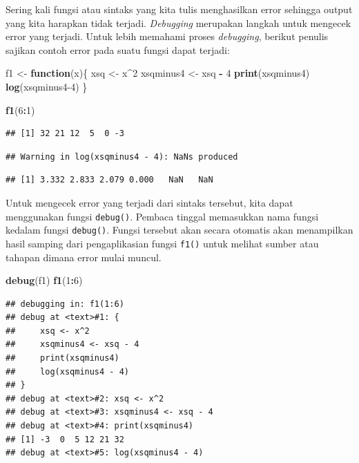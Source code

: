 \documentclass[
]{book}
\newenvironment{Shaded}{\begin{snugshade}}{\end{snugshade}}
\newcommand{\ControlFlowTok}[1]{\textcolor[rgb]{0.13,0.29,0.53}{\textbf{#1}}}
\newcommand{\DecValTok}[1]{\textcolor[rgb]{0.00,0.00,0.81}{#1}}
\newcommand{\FunctionTok}[1]{\textcolor[rgb]{0.13,0.29,0.53}{\textbf{#1}}}
\newcommand{\NormalTok}[1]{#1}
\newcommand{\OtherTok}[1]{\textcolor[rgb]{0.56,0.35,0.01}{#1}}
\newcommand{\SpecialCharTok}[1]{\textcolor[rgb]{0.81,0.36,0.00}{\textbf{#1}}}
\theoremstyle{definition}
\theoremstyle{definition}
\theoremstyle{definition}
\theoremstyle{definition}
\theoremstyle{remark}
\begin{document}
Sering kali fungsi atau sintaks yang kita tulis menghasilkan error sehingga output yang kita harapkan tidak terjadi. \emph{Debugging} merupakan langkah untuk mengecek error yang terjadi. Untuk lebih memahami proses \emph{debugging}, berikut penulis sajikan contoh error pada suatu fungsi dapat terjadi:

\begin{Shaded}
\begin{Highlighting}[]
\NormalTok{f1 }\OtherTok{\textless{}{-}} \ControlFlowTok{function}\NormalTok{(x)\{}
\NormalTok{  xsq }\OtherTok{\textless{}{-}}\NormalTok{ x}\SpecialCharTok{\^{}}\DecValTok{2}
\NormalTok{  xsqminus4 }\OtherTok{\textless{}{-}}\NormalTok{ xsq }\SpecialCharTok{{-}} \DecValTok{4}
  \FunctionTok{print}\NormalTok{(xsqminus4)}
  \FunctionTok{log}\NormalTok{(xsqminus4}\DecValTok{{-}4}\NormalTok{)}
\NormalTok{\}}

\FunctionTok{f1}\NormalTok{(}\DecValTok{6}\SpecialCharTok{:}\DecValTok{1}\NormalTok{)}
\end{Highlighting}
\end{Shaded}

\begin{verbatim}
## [1] 32 21 12  5  0 -3
\end{verbatim}

\begin{verbatim}
## Warning in log(xsqminus4 - 4): NaNs produced
\end{verbatim}

\begin{verbatim}
## [1] 3.332 2.833 2.079 0.000   NaN   NaN
\end{verbatim}

Untuk mengecek error yang terjadi dari sintaks tersebut, kita dapat menggunakan fungsi \texttt{debug()}. Pembaca tinggal memasukkan nama fungsi kedalam fungsi \texttt{debug()}. Fungsi tersebut akan secara otomatis akan menampilkan hasil samping dari pengaplikasian fungsi \texttt{f1()} untuk melihat sumber atau tahapan dimana error mulai muncul.

\begin{Shaded}
\begin{Highlighting}[]
\FunctionTok{debug}\NormalTok{(f1)}
\FunctionTok{f1}\NormalTok{(}\DecValTok{1}\SpecialCharTok{:}\DecValTok{6}\NormalTok{)}
\end{Highlighting}
\end{Shaded}

\begin{verbatim}
## debugging in: f1(1:6)
## debug at <text>#1: {
##     xsq <- x^2
##     xsqminus4 <- xsq - 4
##     print(xsqminus4)
##     log(xsqminus4 - 4)
## }
## debug at <text>#2: xsq <- x^2
## debug at <text>#3: xsqminus4 <- xsq - 4
## debug at <text>#4: print(xsqminus4)
## [1] -3  0  5 12 21 32
## debug at <text>#5: log(xsqminus4 - 4)
\end{verbatim}
\end{document}
